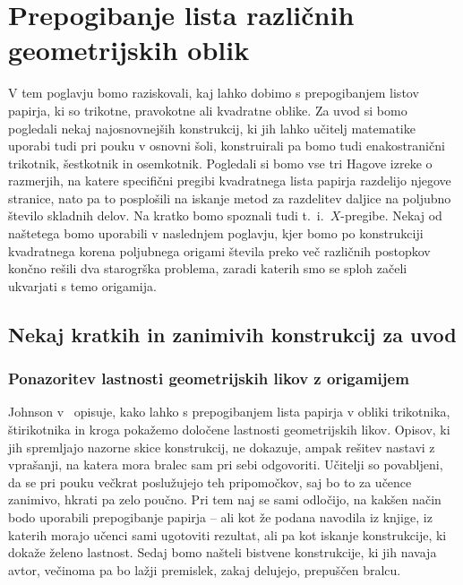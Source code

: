 \section{Prepogibanje lista različnih geometrijskih oblik}
\label{pogl:prepog_geom_likov}

V tem poglavju bomo raziskovali, kaj lahko dobimo s prepogibanjem listov papirja, ki so trikotne, pravokotne ali kvadratne oblike. Za uvod si bomo pogledali nekaj najosnovnejših konstrukcij, ki jih lahko učitelj matematike uporabi tudi pri pouku v osnovni šoli, konstruirali pa bomo tudi enakostranični trikotnik, šestkotnik in osemkotnik. Pogledali si bomo vse tri Hagove izreke o razmerjih, na katere specifični pregibi kvadratnega lista papirja razdelijo njegove stranice, nato pa to posplošili na iskanje metod za razdelitev daljice na poljubno število skladnih delov. Na kratko bomo spoznali tudi t.~i.\ $X$-pregibe. Nekaj od naštetega bomo uporabili v naslednjem poglavju, kjer bomo po konstrukciji kvadratnega korena poljubnega origami števila preko več različnih postopkov končno rešili dva starogrška problema, zaradi katerih smo se sploh začeli ukvarjati s temo origamija.

\subsection{Nekaj kratkih in zanimivih konstrukcij za uvod}

\subsubsection*{Ponazoritev lastnosti geometrijskih likov z origamijem}

Johnson v~\cite{johnson1957} opisuje, kako lahko s prepogibanjem lista papirja v obliki trikotnika, štirikotnika in kroga pokažemo določene lastnosti geometrijskih likov. Opisov, ki jih spremljajo nazorne skice konstrukcij, ne dokazuje, ampak rešitev nastavi z vprašanji, na katera mora bralec sam pri sebi odgovoriti. Učitelji so povabljeni, da se pri pouku večkrat poslužujejo teh pripomočkov, saj bo to za učence zanimivo, hkrati pa zelo poučno. Pri tem naj se sami odločijo, na kakšen način bodo uporabili prepogibanje papirja -- ali kot že podana navodila iz knjige, iz katerih morajo učenci sami ugotoviti rezultat, ali pa kot iskanje konstrukcije, ki dokaže želeno lastnost. Sedaj bomo našteli bistvene konstrukcije, ki jih navaja avtor, večinoma pa bo lažji premislek, zakaj delujejo, prepuščen bralcu.

